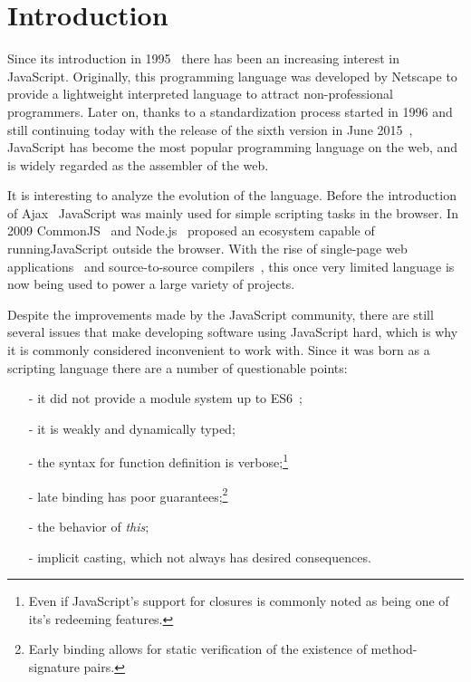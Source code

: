 \documentclass{sig-alternate}
\begin{document}



\section{Introduction}
Since its introduction in 1995~\cite{web:js} there has been an increasing interest in JavaScript. Originally, this programming language was developed by Netscape to provide a lightweight interpreted language to attract non-professional programmers. Later on, thanks to a standardization process started in 1996 and still continuing today with the release of the sixth version in June 2015~\cite{web:ecmascript6}, JavaScript has become the most popular programming language on the web, and is widely regarded as the assembler of the web.

It is interesting to analyze the evolution of the language. Before the introduction of Ajax~\cite{web:ajax} JavaScript was mainly used for simple scripting tasks in the browser. In 2009 CommonJS~\cite{web:commonjs} and Node.js~\cite{web:nodejs} proposed an ecosystem capable of running\newline JavaScript outside the browser. With the rise of single-page web applications~\cite{web:spa} and source-to-source compilers~\cite{web:compile2js}, this once very limited language is now being used to power a large variety of projects.

Despite the improvements made by the JavaScript community, there are still several issues that make developing software using JavaScript hard, which is why it is commonly considered inconvenient to work with. Since it was born as a scripting language there are a number of questionable points:

\begin{itemize}
	\item[-] it did not provide a module system up to ES6~\cite{web:es6modules};
	\item[-] it is weakly and dynamically typed;
	\item[-] the syntax for function definition is verbose;\footnote{Even if JavaScript's support for closures is commonly noted as being one of its\rq{s} redeeming features.}
	\item[-] late binding has poor guarantees;\footnote{Early binding allows for static verification of the existence of method-signature pairs.}
	\item[-] the behavior of \emph{this};
	\item[-] implicit casting, which not always has desired consequences.
\end{itemize}
\end{document}
